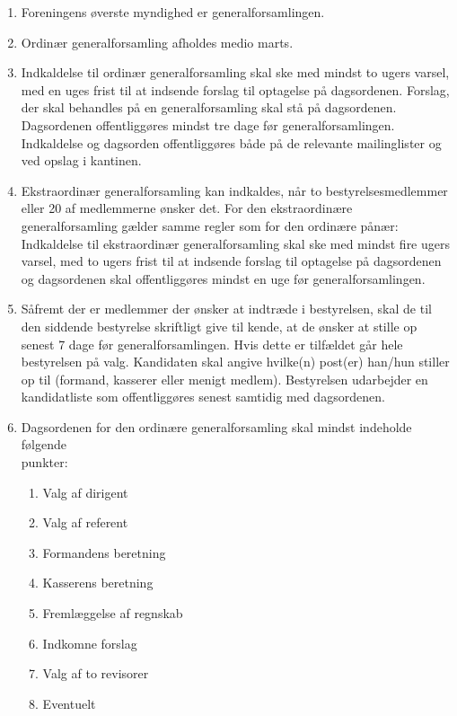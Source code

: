 \documentclass[a4paper, 10pt]{article}
\newenvironment{stykenum}{
  \begin{enumerate}[%
    label=Stk.~\arabic*., ref=\textsection~\theenumi~Stk.~\arabic*, start=1]
}{\end{enumerate}}
\begin{document}
\begin{stykenum}

\item Foreningens øverste myndighed er generalforsamlingen.

\item Ordinær generalforsamling afholdes medio marts.

\item Indkaldelse til ordinær generalforsamling skal ske med mindst to
ugers varsel, med en uges frist til at indsende forslag til optagelse
på dagsordenen. Forslag, der skal behandles på en generalforsamling
skal stå på dagsordenen. Dagsordenen offentliggøres mindst tre dage
før generalforsamlingen. Indkaldelse og dagsorden offentliggøres både
på de relevante mailinglister og ved opslag i kantinen.

\item Ekstraordinær generalforsamling kan indkaldes, når to
bestyrelsesmed\-lemmer eller 20 af medlemmerne ønsker det. For den
ekstraordinære generalforsamling gælder samme regler som for den
ordinære pånær: Indkaldelse til ekstraordinær generalforsamling skal
ske med mindst fire ugers varsel, med to ugers frist til at indsende
forslag til optagelse på dagsordenen og dagsordenen skal
offentliggøres mindst en uge før generalforsamlingen.

\item Såfremt der er medlemmer der ønsker at indtræde i bestyrelsen,
skal de til den siddende bestyrelse skriftligt give til kende, at de
ønsker at stille op senest 7 dage før generalforsamlingen.  Hvis dette er
tilfældet går hele bestyrelsen på valg. Kandidaten skal angive
hvilke(n) post(er) han/hun stiller op til (formand, kasserer eller
menigt medlem). Bestyrelsen udarbejder en kandidatliste som
offentliggøres senest samtidig med dagsordenen.

\item Dagsordenen for den ordinære generalforsamling skal mindst
indeholde følgende \\ punkter:

\begin{enumerate}

\item Valg af dirigent

\item Valg af referent

\item Formandens beretning

\item Kasserens beretning

\item Fremlæggelse af regnskab

\item Indkomne forslag

\item Valg af to revisorer

\item Eventuelt

\end{enumerate}

\end{stykenum}
\end{document}

